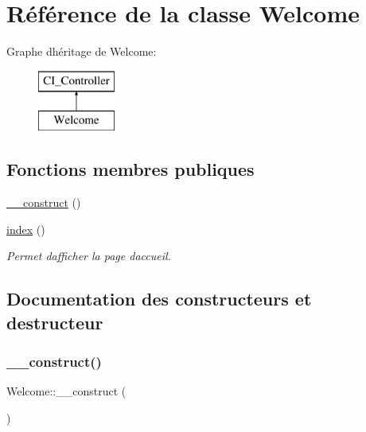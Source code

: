 \hypertarget{class_welcome}{}\section{Référence de la classe Welcome}
\label{class_welcome}
Graphe d\textquotesingle{}héritage de Welcome\+:\begin{figure}[H]
\begin{center}
\leavevmode
\includegraphics[height=2.000000cm]{class_welcome}
\end{center}
\end{figure}
\subsection*{Fonctions membres publiques}
\begin{DoxyCompactItemize}
\item 
\hyperlink{class_welcome_aadb909ade78b1a8ec5dc82eac1cb896f}{\+\_\+\+\_\+construct} ()
\item 
\hyperlink{class_welcome_a8aadbfbd06b65a6538badbed8569b293}{index} ()
\begin{DoxyCompactList}\small\item\em Permet d\textquotesingle{}afficher la page d\textquotesingle{}accueil. \end{DoxyCompactList}\end{DoxyCompactItemize}


\subsection{Documentation des constructeurs et destructeur}
\mbox{\label{class_welcome_aadb909ade78b1a8ec5dc82eac1cb896f}} 
\subsubsection{\texorpdfstring{\+\_\+\+\_\+construct()}{\_\_construct()}}
{\footnotesize\ttfamily Welcome\+::\+\_\+\+\_\+construct (\begin{DoxyParamCaption}{ }\end{DoxyParamCaption})}



